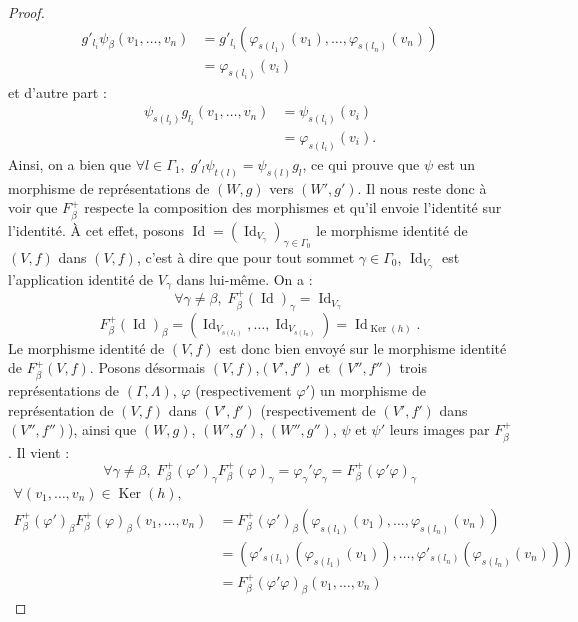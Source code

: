 \documentclass[a4paper,11pt]{article}
\DeclareMathOperator{\Ker}{Ker}
\DeclareMathOperator{\Id}{Id}
\begin{document}
\begin{proof}
\[
\begin{array}{ll}
	g'_{l_{i}}\psi_{\beta}(v_{1},\dots,v_{n})&=g'_{l_{i}}(\varphi_{s(l_{1})}(v_{1}),\dots,\varphi_{s(l_{n})}(v_{n}))\\
	&=\varphi_{s(l_{i})}(v_{i})
\end{array}
\]
et d'autre part :
\[
\begin{array}{ll}
	\psi_{s(l_{i})}g_{l_{i}}(v_{1},\dots,v_{n})&=\psi_{s(l_{i})}(v_{i})\\
	&=\varphi_{s(l_{i})}(v_{i}).
\end{array}
\]
Ainsi, on a bien que $\forall l \in\Gamma_{1},\;g'_{l}\psi_{t(l)}=\psi_{s(l)}g_{l}$, ce qui prouve que $\psi$ est un morphisme de représentations de $(W,g)$ vers $(W',g')$. Il nous reste donc à voir que $F_{\beta}^{+}$ respecte la composition des morphismes et qu'il envoie l'identité sur l'identité. À cet effet, posons $\Id = (\Id_{V_{\gamma}})_{\gamma\in\Gamma_{0}}$ le morphisme identité de $(V,f)$ dans $(V,f)$, c'est à dire que pour tout sommet $\gamma\in\Gamma_{0}$, $\Id_{V_{\gamma}}$ est l'application identité de $V_{\gamma}$ dans lui-même. On a :
\[
	\forall \gamma\neq\beta,\;F_{\beta}^{+}(\Id)_{\gamma}=\Id_{V_{\gamma}}
\]
\[
	F_{\beta}^{+}(\Id)_{\beta}=(\Id_{V_{s(l_{1})}},\dots,\Id_{V_{s(l_{n})}})=\Id_{\Ker(h)}.
\]
Le morphisme identité de $(V,f)$ est donc bien envoyé sur le morphisme identité de $F_{\beta}^{+}(V,f)$. Posons désormais $(V,f)$,$(V',f')$ et $(V'',f'')$ trois représentations de $(\Gamma,\Lambda)$, $\varphi$ (respectivement $\varphi '$) un morphisme de représentation de $(V,f)$ dans $(V',f')$ (respectivement de $(V',f')$ dans $(V'',f'')$), ainsi que $(W,g)$, $(W',g')$, $(W'',g'')$, 
 $\psi$ et $\psi '$ leurs images par $F_{\beta}^{+}$. Il vient :
\[
	\forall \gamma\neq\beta,\;F_{\beta}^{+}(\varphi')_{\gamma}F_{\beta}^{+}(\varphi)_{\gamma}=\varphi_{\gamma}'\varphi_{\gamma}=F_{\beta}^{+}(\varphi'\varphi)_{\gamma}
\]
\[
	\begin{array}{ll}
		\forall (v_{1},\dots,v_{n})\in\Ker(h),& \\
		F_{\beta}^{+}(\varphi')_{\beta}F_{\beta}^{+}(\varphi)_{\beta}(v_{1},\dots,v_{n})&=F_{\beta}^{+}(\varphi')_{\beta}(\varphi_{s(l_{1})}(v_{1}),\dots,\varphi_{s(l_{n})}(v_{n}))\\
		&=(\varphi'_{s(l_{1})}(\varphi_{s(l_{1})}(v_{1})),\dots,\varphi'_{s(l_{n})}(\varphi_{s(l_{n})}(v_{n})))\\
		&=F_{\beta}^{+}(\varphi'\varphi)_{\beta}(v_{1},\dots,v_{n})


\end{array}\]
\end{proof}
\end{document}
